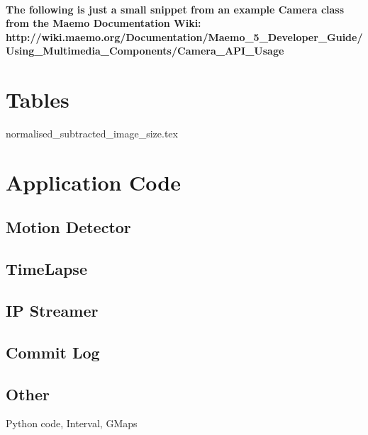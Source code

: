 \documentclass[11pt]{article} %
\begin{document}
\paragraph{ The following is just a small snippet from an example Camera class from the Maemo Documentation Wiki:
http://wiki.maemo.org/Documentation/Maemo\_5\_Developer\_Guide/Using\_Multimedia\_Components/Camera\_API\_Usage}


\section{Tables}
{normalised_subtracted_image_size.tex}


\section{Application Code}
\subsection{Motion Detector}
\subsection{TimeLapse}
\subsection{IP Streamer}
\subsection{Commit Log}
\subsection{Other}{Python code, Interval, GMaps}
\end{document}
